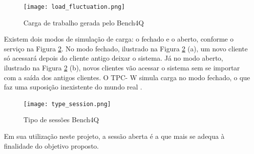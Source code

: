 
\begin{figure}[htb]
	\centering
	\texttt{[image: load\_fluctuation.png]}
	\caption{Carga de trabalho gerada pelo Bench4Q}
	\label{fig:carga-gerada}
\end{figure}


Existem dois modos de simulação de carga: o fechado e o aberto, conforme o serviço na Figura \ref{fig:type-session}. No modo fechado, ilustrado na Figura \ref{fig:type-session} (a), um novo cliente só acessará depois do cliente antigo deixar o sistema. Já no modo aberto, ilustrado na Figura \ref{fig:type-session} (b), novos clientes vão acessar o sistema sem se importar com a saída dos antigos clientes. O TPC- W simula carga no modo fechado, o que faz uma suposição inexistente do mundo real \cite{Bench4Q}. 

\begin{figure}[htb]
	\centering
	\texttt{[image: type\_session.png]}
	\caption{Tipo de sessões Bench4Q}
	\label{fig:type-session}
\end{figure}


Em sua utilização neste projeto, a sessão aberta é a que mais se adequa à finalidade do objetivo proposto.


